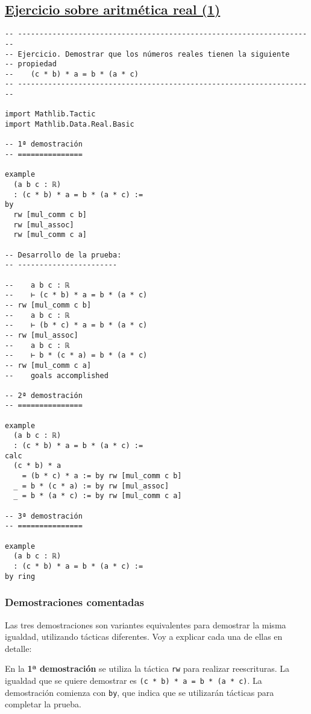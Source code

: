 \subsection{\href{./src/Basicos/Ejercicio\_sobre\_aritmetica\_real\_1.lean}{Ejercicio sobre aritmética real (1)}}
\label{sec:org810f6e0}
\begin{verbatim}
-- ---------------------------------------------------------------------
-- Ejercicio. Demostrar que los números reales tienen la siguiente
-- propiedad
--    (c * b) * a = b * (a * c)
-- ---------------------------------------------------------------------

import Mathlib.Tactic
import Mathlib.Data.Real.Basic

-- 1ª demostración
-- ===============

example
  (a b c : ℝ)
  : (c * b) * a = b * (a * c) :=
by
  rw [mul_comm c b]
  rw [mul_assoc]
  rw [mul_comm c a]

-- Desarrollo de la prueba:
-- -----------------------

--    a b c : ℝ
--    ⊢ (c * b) * a = b * (a * c)
-- rw [mul_comm c b]
--    a b c : ℝ
--    ⊢ (b * c) * a = b * (a * c)
-- rw [mul_assoc]
--    a b c : ℝ
--    ⊢ b * (c * a) = b * (a * c)
-- rw [mul_comm c a]
--    goals accomplished

-- 2ª demostración
-- ===============

example
  (a b c : ℝ)
  : (c * b) * a = b * (a * c) :=
calc
  (c * b) * a
    = (b * c) * a := by rw [mul_comm c b]
  _ = b * (c * a) := by rw [mul_assoc]
  _ = b * (a * c) := by rw [mul_comm c a]

-- 3ª demostración
-- ===============

example
  (a b c : ℝ)
  : (c * b) * a = b * (a * c) :=
by ring
\end{verbatim}
\subsubsection*{Demostraciones comentadas}

Las tres demostraciones son variantes equivalentes para demostrar la
misma igualdad, utilizando tácticas diferentes. Voy a explicar
cada una de ellas en detalle:

En la \textbf{1ª demostración} se utiliza la táctica \texttt{rw} para realizar
reescrituras. La igualdad que se quiere demostrar es \texttt{(c * b) * a = b *
(a * c)}. La demostración comienza con \texttt{by}, que indica que se utilizarán
tácticas para completar la prueba.

